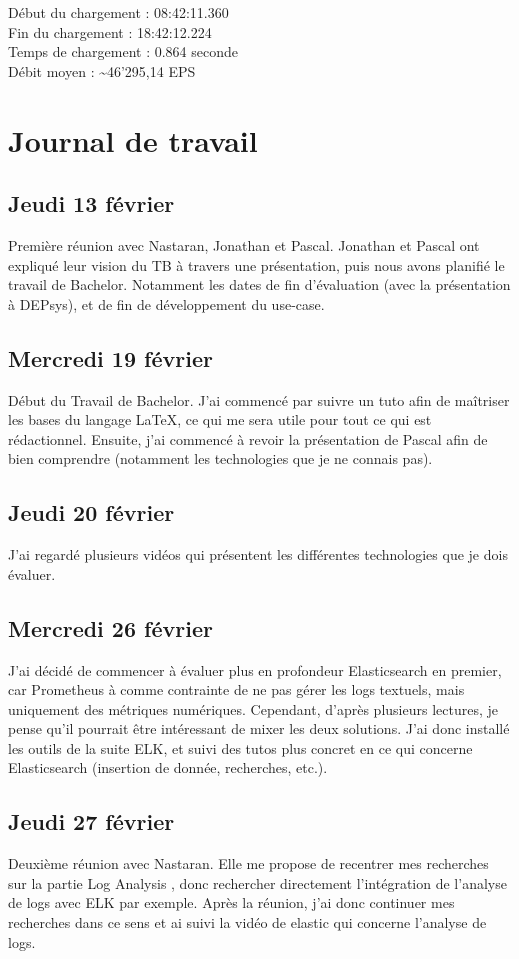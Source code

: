 \documentclass[paper=a4, fontsize=11pt]{scrartcl}
\begin{document}
Début du chargement : 08:42:11.360 \\
Fin du chargement : 18:42:12.224 \\
Temps de chargement : 0.864 seconde \\
Débit moyen : \textasciitilde 46'295,14 EPS \\

\section{Journal de travail}


\subsection{Jeudi 13 février}
    Première réunion avec Nastaran, Jonathan et Pascal. Jonathan et Pascal ont expliqué leur vision du TB à travers une présentation, puis nous avons planifié le travail de Bachelor. Notamment les dates de fin d'évaluation (avec la présentation à DEPsys), et de fin de développement du use-case.
\subsection{Mercredi 19 février}
    Début du Travail de Bachelor. J'ai commencé par suivre un tuto afin de maîtriser les bases du langage \LaTeX, ce qui me sera utile pour tout ce qui est rédactionnel. Ensuite, j'ai commencé à revoir la présentation de Pascal afin de bien comprendre (notamment les technologies que je ne connais pas).
\subsection{Jeudi 20 février}
    J'ai regardé plusieurs vidéos qui présentent les différentes technologies que je dois évaluer.
\subsection{Mercredi 26 février}
    J'ai décidé de commencer à évaluer plus en profondeur Elasticsearch en premier, car Prometheus à comme contrainte de ne pas gérer les logs textuels, mais uniquement des métriques numériques. Cependant, d'après plusieurs lectures, je pense qu'il pourrait être intéressant de mixer les deux solutions. J'ai donc installé les outils de la suite ELK, et suivi des tutos plus concret en ce qui concerne Elasticsearch (insertion de donnée, recherches, etc.).
\subsection{Jeudi 27 février}
    Deuxième réunion avec Nastaran. Elle me propose de recentrer mes recherches sur la partie \og Log Analysis \fg, donc rechercher directement l'intégration de l'analyse de logs avec ELK par exemple. Après la réunion, j'ai donc continuer mes recherches dans ce sens et ai suivi la vidéo de elastic qui concerne l'analyse de logs.
\end{document}
